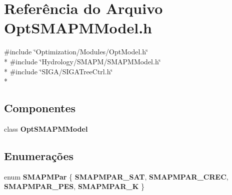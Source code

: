 \section{Referência do Arquivo Opt\+S\+M\+A\+P\+M\+Model.\+h}
\label{_opt_s_m_a_p_m_model_8h}
{\ttfamily \#include \char`\"{}Optimization/\+Modules/\+Opt\+Model.\+h\char`\"{}}\\*
{\ttfamily \#include \char`\"{}Hydrology/\+S\+M\+A\+P\+M/\+S\+M\+A\+P\+M\+Model.\+h\char`\"{}}\\*
{\ttfamily \#include \char`\"{}S\+I\+G\+A/\+S\+I\+G\+A\+Tree\+Ctrl.\+h\char`\"{}}\\*
\subsection*{Componentes}
\begin{DoxyCompactItemize}
\item 
class {\bf Opt\+S\+M\+A\+P\+M\+Model}
\end{DoxyCompactItemize}
\subsection*{Enumerações}
\begin{DoxyCompactItemize}
\item 
enum {\bf S\+M\+A\+P\+M\+Par} \{ {\bf S\+M\+A\+P\+M\+P\+A\+R\+\_\+\+S\+AT}, 
{\bf S\+M\+A\+P\+M\+P\+A\+R\+\_\+\+C\+R\+EC}, 
{\bf S\+M\+A\+P\+M\+P\+A\+R\+\_\+\+P\+ES}, 
{\bf S\+M\+A\+P\+M\+P\+A\+R\+\_\+K}
 \}
\end{DoxyCompactItemize}
